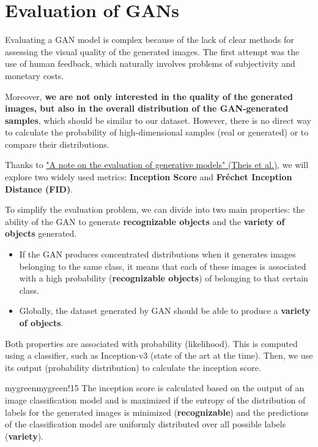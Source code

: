 \section{Evaluation of GANs}

Evaluating a GAN model is complex because of the lack of clear methods for assessing the visual quality of the generated images. The first attempt was the use of human feedback, which naturally involves problems of subjectivity and monetary costs.

Moreover, \textbf{we are not only interested in the quality of the generated images, but also in the overall distribution of the GAN-generated samples}, which should be similar to our dataset. However, there is no direct way to calculate the probability of high-dimensional samples (real or generated) or to compare their distributions.

Thanks to \href{https://arxiv.org/pdf/1511.01844}{"A note on the evaluation of generative models" (Theis et al.)}, we will explore two widely used metrics: \textbf{Inception Score} and \textbf{Fréchet Inception Distance (FID)}.

To simplify the evaluation problem, we can divide into two main properties: the ability of the GAN to generate \textbf{recognizable objects} and the \textbf{variety of objects} generated.
\begin{itemize}
    \item If the GAN produces concentrated distributions when it generates images belonging to the same class, it means that each of these images is associated with a high probability (\textbf{recognizable objects}) of belonging to that certain class.
    \item Globally, the dataset generated by GAN should be able to produce a \textbf{variety of objects}.
\end{itemize}

Both properties are associated with probability (likelihood). This is computed using a classifier, such as Inception-v3 (state of the art at the time). Then, we use its output (probability distribution) to calculate the inception score.

\begin{remark}{mygreen}{mygreen!15}
The inception score is calculated based on the output of an image classification model and is maximized if the entropy of the distribution of labels for the generated images is minimized (\textbf{recognizable}) and the predictions of the classification model are uniformly distributed over all possible labels (\textbf{variety}).
\end{remark}

